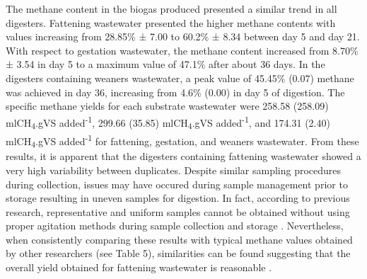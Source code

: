 The methane content in the biogas produced presented a similar trend in all digesters. Fattening wastewater presented the higher methane contents with values increasing from 28.85\% ± 7.00 to 60.2\% ± 8.34 between day 5 and day 21. With respect to gestation wastewater, the methane content increased from 8.70\% ± 3.54 in day 5 to a maximum value of 47.1\%  after about 36 days. In the digesters containing weaners wastewater, a peak value of 45.45\% (0.07) methane was achieved in day 36, increasing from 4.6\% (0.00) in day 5 of digestion. The specific methane yields for each substrate wastewater were 258.58 (258.09) mlCH\textsubscript{4}.gVS added\textsuperscript{-1}, 299.66 (35.85) mlCH\textsubscript{4}.gVS added\textsuperscript{-1}, and 174.31 (2.40) mlCH\textsubscript{4}.gVS added\textsuperscript{-1} for fattening, gestation, and weaners wastewater. From these results, it is apparent that the digesters containing fattening wastewater showed a very high variability between duplicates. Despite similar sampling procedures during collection, issues may have occured during sample management prior to storage resulting in uneven samples for digestion. In fact,  according to previous research, representative and uniform samples cannot be obtained without using proper agitation methods during sample collection and storage \cite{Zhu_2004}. Nevertheless, when consistently comparing these results with typical methane values obtained by other researchers (see Table 5), similarities can be found suggesting that the overall yield obtained for fattening wastewater is  reasonable \cite{Guo_2012,Zhang_2014}.